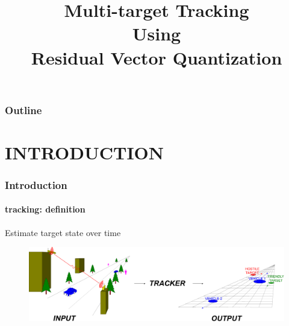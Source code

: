 
\title{Multi-target Tracking\\Using\\Residual Vector Quantization}
\begin{frame}[plain]
\logoTechTower
	\titlepage
\end{frame}

\begin{frame}\frametitle{Outline}
\logoTechTower
	\setcounter{tocdepth}{1}	
	\tableofcontents
\end{frame}


\section{INTRODUCTION}

\begin{frame}
\frametitle{Introduction}
\framesubtitle{tracking: definition}
\logoCSIPCPL\mypagenum
	Estimate {\color{red}target state} over {\color{red}time}
	\begin{figure}
		\includegraphics[width=1.0\textwidth]{figs/TRK_overviewDiagram.pdf}
	\end{figure}
\end{frame}



